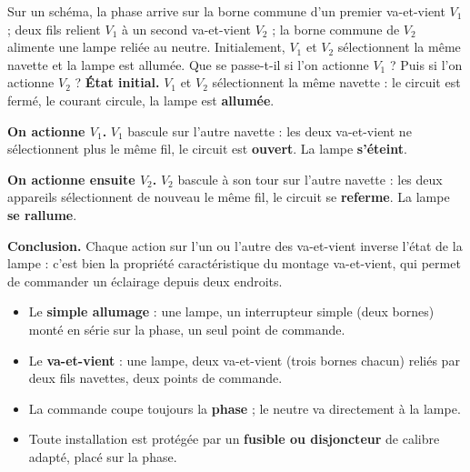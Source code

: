 \documentclass[11pt]{article}
\begin{document}
\begin{exoresolu}
Sur un schéma, la phase arrive sur la borne commune d'un premier va-et-vient $V_1$ ; deux fils relient $V_1$ à un second va-et-vient $V_2$ ; la borne commune de $V_2$ alimente une lampe reliée au neutre. Initialement, $V_1$ et $V_2$ sélectionnent la même navette et la lampe est allumée. Que se passe-t-il si l'on actionne $V_1$ ? Puis si l'on actionne $V_2$ ?
\tcblower
\textbf{État initial.} $V_1$ et $V_2$ sélectionnent la même navette : le circuit est fermé, le courant circule, la lampe est \textbf{allumée}.

\textbf{On actionne $V_1$.} $V_1$ bascule sur l'autre navette : les deux va-et-vient ne sélectionnent plus le même fil, le circuit est \textbf{ouvert}. La lampe \textbf{s'éteint}.

\textbf{On actionne ensuite $V_2$.} $V_2$ bascule à son tour sur l'autre navette : les deux appareils sélectionnent de nouveau le même fil, le circuit se \textbf{referme}. La lampe \textbf{se rallume}.

\textbf{Conclusion.} Chaque action sur l'un ou l'autre des va-et-vient inverse l'état de la lampe : c'est bien la propriété caractéristique du montage va-et-vient, qui permet de commander un éclairage depuis deux endroits.
\end{exoresolu}

\begin{aretenir}
\begin{itemize}
\item Le \textbf{simple allumage} : une lampe, un interrupteur simple (deux bornes) monté en série sur la phase, un seul point de commande.
\item Le \textbf{va-et-vient} : une lampe, deux va-et-vient (trois bornes chacun) reliés par deux fils navettes, deux points de commande.
\item La commande coupe toujours la \textbf{phase} ; le neutre va directement à la lampe.
\item Toute installation est protégée par un \textbf{fusible ou disjoncteur} de calibre adapté, placé sur la phase.
\end{itemize}
\end{aretenir}
\end{document}
